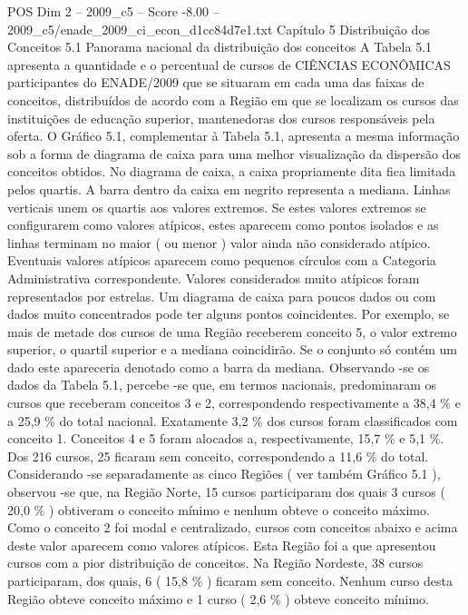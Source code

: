 \begin{textsample}{POS Dim 2 – 2009\_c5 – Score -8.00 – 2009\_c5/enade\_2009\_ci\_econ\_d1cc84d7e1.txt}  \label{ex:f2_pos_421}
Capítulo 5 Distribuição dos Conceitos 5.1 Panorama nacional da distribuição dos conceitos A Tabela 5.1 apresenta a quantidade e o percentual de cursos de CIÊNCIAS ECONÔMICAS participantes do ENADE/2009 que se situaram em cada uma das faixas de conceitos, distribuídos de acordo com a Região em que se localizam os cursos das instituições de educação superior, mantenedoras dos cursos responsáveis pela oferta.
O Gráfico 5.1, complementar à Tabela 5.1, apresenta a mesma informação sob a forma de diagrama de caixa para uma melhor visualização da dispersão dos conceitos obtidos.
No diagrama de caixa, a caixa propriamente dita fica limitada pelos quartis.
A barra dentro da caixa em negrito representa a mediana.
Linhas verticais unem os quartis aos valores extremos.
Se estes valores extremos se configurarem como valores atípicos, estes aparecem como pontos isolados e as linhas terminam no maior ( ou menor ) valor ainda não considerado atípico.
Eventuais valores atípicos aparecem como pequenos círculos com a Categoria Administrativa correspondente.
Valores considerados muito atípicos foram representados por estrelas.
Um diagrama de caixa para poucos dados ou com dados muito concentrados pode ter alguns pontos coincidentes.
Por exemplo, se mais de metade dos cursos de uma Região receberem conceito 5, o valor extremo superior, o quartil superior e a mediana coincidirão.
Se o conjunto só contém um dado este apareceria denotado como a barra da mediana.
Observando -se os dados da Tabela 5.1, percebe -se que, em termos nacionais, predominaram os cursos que receberam conceitos 3 e 2, correspondendo respectivamente a 38,4 \% e a 25,9 \% do total nacional.
Exatamente 3,2 \% dos cursos foram classificados com conceito 1.
Conceitos 4 e 5 foram alocados a, respectivamente, 15,7 \% e 5,1 \%.
Dos 216 cursos, 25 ficaram sem conceito, correspondendo a 11,6 \% do total.
Considerando -se separadamente as cinco Regiões ( ver também Gráfico 5.1 ), observou -se que, na Região Norte, 15 cursos participaram dos quais 3 cursos ( 20,0 \% ) obtiveram o conceito mínimo e nenhum obteve o conceito máximo.
Como o conceito 2 foi modal e centralizado, cursos com conceitos abaixo e acima deste valor aparecem como valores atípicos.
Esta Região foi a que apresentou cursos com a pior distribuição de conceitos.
Na Região Nordeste, 38 cursos participaram, dos quais, 6 ( 15,8 \% ) ficaram sem conceito.
Nenhum curso desta Região obteve conceito máximo e 1 curso ( 2,6 \% ) obteve conceito mínimo.

\end{textsample}
